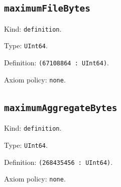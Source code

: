 \documentclass[11pt]{article}
\begin{document}
\subsection*{\texttt{maximumFileBytes}}
\noindent Kind: \texttt{definition}.\par
\noindent Type: \texttt{UInt64}.\par
\noindent Definition: \texttt{(67108864 : UInt64)}.\par
\noindent Axiom policy: \texttt{none}.\par
\subsection*{\texttt{maximumAggregateBytes}}
\noindent Kind: \texttt{definition}.\par
\noindent Type: \texttt{UInt64}.\par
\noindent Definition: \texttt{(268435456 : UInt64)}.\par
\noindent Axiom policy: \texttt{none}.\par
\end{document}

